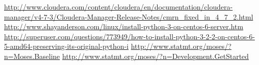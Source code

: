 \renewcommand{\bibname}{Список используемой литературы}
\begin{thebibliography}{10}
     \url{http://www.cloudera.com/content/cloudera/en/documentation/cloudera-manager/v4-7-3/Cloudera-Manager-Release-Notes/cmrn_fixed_in_4_7_2.html}
     \url{http://www.shayanderson.com/linux/install-python-3-on-centos-6-server.htm}
     \url{http://superuser.com/questions/773949/how-to-install-python-3-2-2-on-centos-6-5-amd64-preserving-its-original-python-i}
     \url{http://www.statmt.org/moses/?n=Moses.Baseline}
     \url{http://www.statmt.org/moses/?n=Development.GetStarted}
\end{thebibliography}